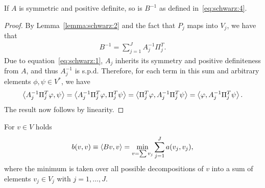 \begin{lemma}
  \label{lemma:schwarz:3}
  If $A$ is symmetric and positive definite, so is $B^{-1}$ as defined
  in~\eqref{eq:schwarz:4}.
\end{lemma}

\begin{proof}
  By Lemma~\ref{lemma:schwarz:2} and the fact that $P_j$ maps into $V_j$, we have that
  \begin{gather}
    \label{eq:schwarz:16}
    B^{-1} = \sum_{j=1}^J A_j^{-1} \Pi^T_j.
  \end{gather}
  Due to equation~\eqref{eq:schwarz:1}, $A_j$ inherits its symmetry
  and positive definiteness from $A$, and thus $A_j^{-1}$ is s.p.d.
  Therefore, for each term in this sum and arbitrary elements
  $\phi,\psi\in V^*$, we have
  \begin{gather*}
    \scal(A_j^{-1} \Pi^T_j \phi, \psi)
    = \scal(A_j^{-1} \Pi^T_j \phi, \Pi^T_j \psi)
    = \scal(\Pi^T_j \phi, A_j^{-1}\Pi^T_j \psi)
    = \scal(\phi, A_j^{-1}\Pi^T_j \psi).
  \end{gather*}
  The result now follows by linearity.
\end{proof}

\begin{lemma}
  \label{lemma:schwarz:5}
  For $v\in V$ holds
  \begin{gather}
    \label{eq:schwarz:5}
    b(v,v) \equiv \scal(B v,v) = \min_{v=\sum v_j} \sum_{j=1}^J a(v_j,v_j),
  \end{gather}
  where the minimum is taken over all possible decompositions of $v$
  into a sum of elements $v_j\in V_j$ with $j=1,\dots,J$.
\end{lemma}

